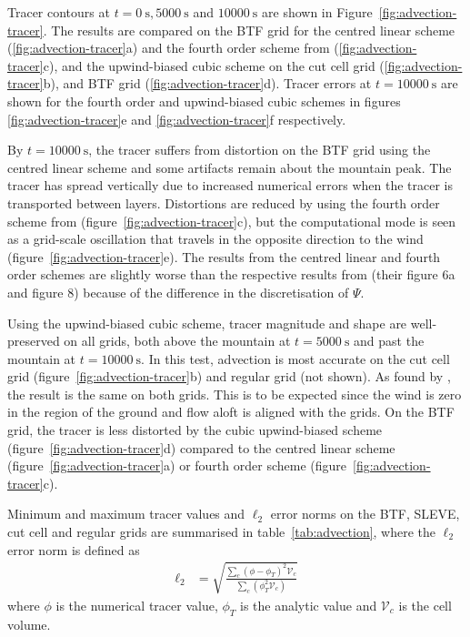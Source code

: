 \documentclass[draft]{ametsoc}
\begin{document}
Tracer contours at \(t = \SI{0}{\second}, \SI{5000}{\second}\) and \(\SI{10000}{\second}\) are shown in Figure~\ref{fig:advection-tracer}.
The results are compared on the BTF grid for the centred linear scheme (\ref{fig:advection-tracer}a) and the fourth order scheme from \citet{schaer2002} (\ref{fig:advection-tracer}c), and the upwind-biased cubic scheme on the cut cell grid (\ref{fig:advection-tracer}b), and BTF grid (\ref{fig:advection-tracer}d).  Tracer errors at \(t = \SI{10000}{\second}\) are shown for the fourth order and upwind-biased cubic schemes in figures \ref{fig:advection-tracer}e and \ref{fig:advection-tracer}f respectively.

By \(t = \SI{10000}{\second}\), the tracer suffers from distortion on the BTF grid using the centred linear scheme and some artifacts remain about the mountain peak.  The tracer has spread vertically due to increased numerical errors when the tracer is transported between layers.  Distortions are reduced by using the fourth order scheme from \citet{schaer2002} (figure~\ref{fig:advection-tracer}c), but the computational mode is seen as a grid-scale oscillation that travels in the opposite direction to the wind (figure~\ref{fig:advection-tracer}e).  The results from the centred linear and fourth order schemes are slightly worse than the respective results from \citet{schaer2002} (their figure 6a and figure 8) because of the difference in the discretisation of $\Psi$.

Using the upwind-biased cubic scheme, tracer magnitude and shape are well-preserved on all grids, both above the mountain at \(t = \SI{5000}{\second}\) and past the mountain at \(t = \SI{10000}{\second}\).  In this test, advection is most accurate on the cut cell grid (figure~\ref{fig:advection-tracer}b) and regular grid (not shown).  As found by \citet{good2014}, the result is the same on both grids.  This is to be expected since the wind is zero in the region of the ground and flow aloft is aligned with the grids.  On the BTF grid, the tracer is less distorted by the cubic upwind-biased scheme (figure~\ref{fig:advection-tracer}d) compared to the centred linear scheme (figure~\ref{fig:advection-tracer}a) or fourth order scheme (figure~\ref{fig:advection-tracer}c).

Minimum and maximum tracer values and \(\ell_2\) error norms on the BTF, SLEVE, cut cell and regular grids are summarised in table~\ref{tab:advection}, where the \(\ell_2\) error norm is defined as 
\begin{align}
	\ell_2 &= \sqrt{\frac{\sum_c \left( \phi - \phi_{T} \right)^2 \mathcal{V}_c}{\sum_c \left( \phi_T^2 \mathcal{V}_c \right)}} \label{eqn:l2-error}
\end{align}
where $\phi$ is the numerical tracer value, $\phi_T$ is the analytic value and $\mathcal{V}_c$ is the cell volume.
\end{document}

